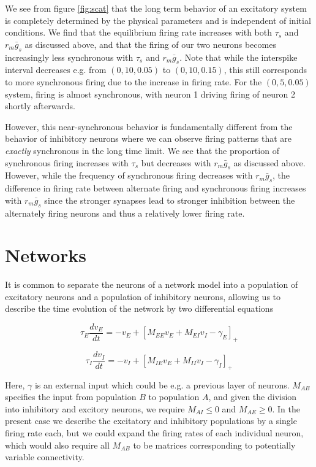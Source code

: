 \documentclass{article}
\begin{document}
We see from figure  \ref{fig:scat} that the long term behavior of an excitatory system is completely determined by the physical parameters and is independent of initial conditions. We find that the equilibrium firing rate increases with both $\tau_s$ and $r_m \bar g_s$ as discussed above, and that the firing of our two neurons becomes increasingly less synchronous with $\tau_s$ and $r_m \bar g_s$. Note that while the interspike interval decreases e.g. from $(0,10,0.05)$ to $(0,10,0.15)$, this still corresponds to more synchronous firing due to the increase in firing rate. For the $(0,5,0.05)$ system, firing is almost synchronous, with neuron 1 driving firing of neuron 2 shortly afterwards.

However, this near-synchronous behavior is fundamentally different from the behavior of inhibitory neurons where we can observe firing patterns that are \textit{exactly} synchronous in the long time limit. We see that the proportion of synchronous firing increases with $\tau_s$ but decreases with $r_m \bar g_s$ as discussed above. However, while the frequency of synchronous firing decreases with $r_m \bar g_s$, the difference in firing rate between alternate firing and synchronous firing increases with $r_m \bar g_s$ since the stronger synapses lead to stronger inhibition between the alternately firing neurons and thus a relatively lower firing rate.


\section{Networks}

It is common to separate the neurons of a network model into a population of excitatory neurons and a population of inhibitory neurons, allowing us to describe the time evolution of the network by two differential equations

\begin{equation}
\tau_E \dfrac{dv_E}{dt} = -v_E + [M_{EE}v_E+M_{EI}v_I-\gamma_E]_+
\end{equation}

\begin{equation}
\tau_I \dfrac{dv_I}{dt} = -v_I + [M_{IE}v_E+M_{II}v_I-\gamma_I]_+
\end{equation}

Here, $\gamma$ is an external input which could be e.g. a previous layer of neurons. $M_{AB}$ specifies the input from population $B$ to population $A$, and given the division into inhibitory and excitory neurons, we require $M_{AI} \leq 0$ and $M_{AE} \geq 0$. In the present case we describe the excitatory and inhibitory populations by a single firing rate each, but we could expand the firing rates of each individual neuron, which would also require all $M_{AB}$ to be matrices corresponding to potentially variable connectivity.
\end{document}
